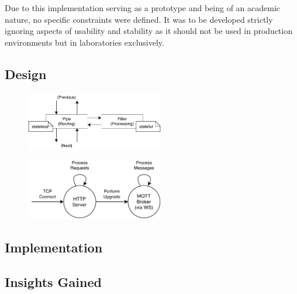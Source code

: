 Due to this implementation serving as a prototype and being of an academic nature, no specific constraints were defined. It was to be developed strictly ignoring aspects of usability and stability as it should not be used in production environments but in laboratories exclusively.

\subsection{Design}
\begin{figure}[h]
    \centering
    \includegraphics[width=6cm]{img/ch04/Architecture - Pipes and Filters.pdf}
    \label{fig:aws-statemachine}
\end{figure}


\begin{figure}[h] 
    \centering
    \includegraphics[width=6cm]{img/ch04/Statemachine 2.pdf}
    \label{fig:aws-statemachine}
\end{figure}


\subsection{Implementation}

\subsection{Insights Gained}



